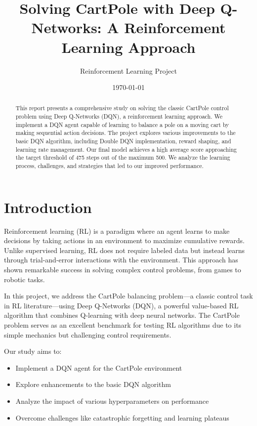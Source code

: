 \documentclass[11pt,a4paper]{article}
\title{Solving CartPole with Deep Q-Networks: A Reinforcement Learning Approach}
\author{Reinforcement Learning Project}
\date{\today}
\begin{document}
\maketitle

\begin{abstract}
This report presents a comprehensive study on solving the classic CartPole control problem using Deep Q-Networks (DQN), a reinforcement learning approach. We implement a DQN agent capable of learning to balance a pole on a moving cart by making sequential action decisions. The project explores various improvements to the basic DQN algorithm, including Double DQN implementation, reward shaping, and learning rate management. Our final model achieves a high average score approaching the target threshold of 475 steps out of the maximum 500. We analyze the learning process, challenges, and strategies that led to our improved performance.
\end{abstract}

\tableofcontents
\newpage

\section{Introduction}

Reinforcement learning (RL) is a paradigm where an agent learns to make decisions by taking actions in an environment to maximize cumulative rewards. Unlike supervised learning, RL does not require labeled data but instead learns through trial-and-error interactions with the environment. This approach has shown remarkable success in solving complex control problems, from games to robotic tasks.

In this project, we address the CartPole balancing problem—a classic control task in RL literature—using Deep Q-Networks (DQN), a powerful value-based RL algorithm that combines Q-learning with deep neural networks. The CartPole problem serves as an excellent benchmark for testing RL algorithms due to its simple mechanics but challenging control requirements.

Our study aims to:
\begin{itemize}
    \item Implement a DQN agent for the CartPole environment
    \item Explore enhancements to the basic DQN algorithm
    \item Analyze the impact of various hyperparameters on performance
    \item Overcome challenges like catastrophic forgetting and learning plateaus
\end{itemize}
\end{document}
